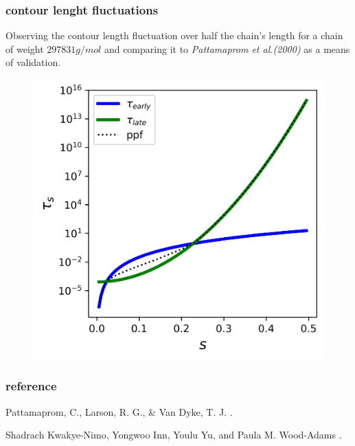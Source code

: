 \documentclass{beamer}
\begin{document}
\begin{frame}
\frametitle{contour lenght fluctuations}
Observing the contour length fluctuation over half the chain's length for a chain of weight $297831 g/mol$ and comparing it to \textit{Pattamaprom et al.(2000)} as a means of validation.

\begin{figure}
\includegraphics[scale=0.7]{figures/ppf.png}
\end{figure}

\end{frame}



\begin{frame}
\frametitle{reference}
\begin{thebibliography}{10}
\alert{Pattamaprom, C., Larson, R. G., \& Van Dyke, T. J.}
.

\alert{Shadrach Kwakye-Nimo, Yongwoo Inn, Youlu Yu, and Paula M. Wood-Adams}
.
\end{thebibliography}

\end{frame}
\end{document}
